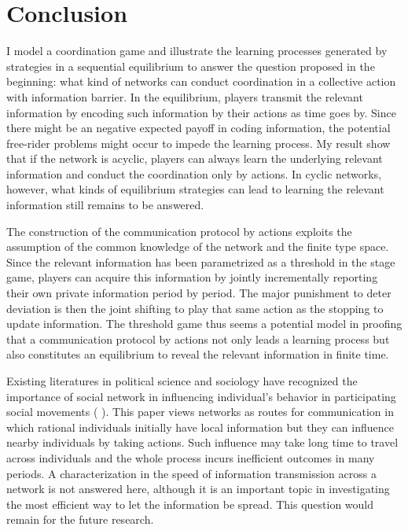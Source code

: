 \documentclass[12pt,letter]{article}
\theoremstyle{definition}
\theoremstyle{remark}
\theoremstyle{claim}
\begin{document}
\section{Conclusion}
\label{sec:con}

I model a coordination game and illustrate the learning processes generated by strategies in a sequential equilibrium to answer the question proposed in the beginning: what kind of networks can conduct coordination in a collective action with information barrier. In the equilibrium, players transmit the relevant information by encoding such information by their actions as time goes by. Since there might be an negative expected payoff in coding information, the potential free-rider problems might occur to impede the learning process. My result show that if the network is acyclic, players can always learn the underlying relevant information and conduct the coordination only by actions. In cyclic networks, however, what kinds of equilibrium strategies can lead to learning the relevant information still remains to be answered.


The construction of the communication protocol by actions exploits the assumption of the common knowledge of the network and the finite type space. Since the relevant information has been parametrized as a threshold in the stage game, players can acquire this information by jointly incrementally reporting their own private information period by period. The major punishment to deter deviation is then the joint shifting to play that same action as the stopping to update information. The threshold game thus seems a potential model in proofing that a communication protocol by actions not only leads a learning process but also constitutes an equilibrium to reveal the relevant information in finite time.

Existing literatures in political science and sociology have recognized the importance of social network in influencing individual's behavior in participating social movements ( \citep{Passy2003}\citep{McAdam2003}\citep{Siegel2009}). This paper views networks as routes for communication in which rational individuals initially have local information but they can influence nearby individuals by taking actions. Such influence may take long time to travel across individuals and the whole process incurs inefficient outcomes in many periods. A characterization in the speed of information transmission across a network is not answered here, although it is an important topic in investigating the most efficient way to let the information be spread. This question would remain for the future research.
\end{document}
